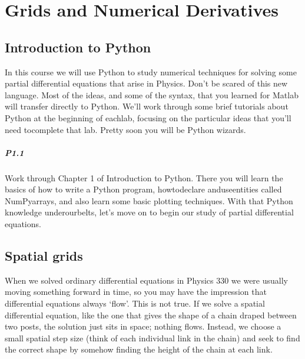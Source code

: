 \documentclass{book}
\theoremstyle{plain}
\theoremstyle{definition}
\numberwithin{exm}{chapter}
\theoremstyle{remark}
\theoremstyle{summary}
\theoremstyle{overview}
\begin{document}
		
    \tableofcontents
    
    \chapter*{Grids and Numerical Derivatives}
    
    \section*{Introduction to Python}
  
    In this course we will use Python to study numerical techniques for solving some partial differential equations that arise in Physics. 
    Don\rq t be scared of this new language. 
    Most of the ideas, and some of the syntax, that you learned for Matlab will transfer directly to Python. 
    We\rq ll work through some brief tutorials about Python at the beginning of eachlab, focusing on the particular ideas that you\rq ll need tocomplete 		    that lab. 
    Pretty soon you will be Python wizards. 
    
    
    \paragraph*{P1.1}
     Work through Chapter 1 of Introduction to Python. There you will learn the basics of how to write a Python program, howtodeclare anduseentities called NumPyarrays, and also learn some basic plotting techniques. 
     With that Python knowledge underourbelts, let\rq s move on to begin our study of partial differential equations.
   

    \section*{Spatial grids}
    
    When we solved ordinary differential equations in Physics 330 we were usually moving something forward in time, so you may have the impression that differential equations always \lq flow\rq .  This is not true. If we solve a spatial differential equation, like the one that gives the shape of a chain draped between two posts, the solution just sits in space; nothing flows. Instead, we choose a small spatial step size (think of each individual link in the chain) and seek to find the correct shape by somehow finding the height of the chain at each link.   
    
\end{document}
